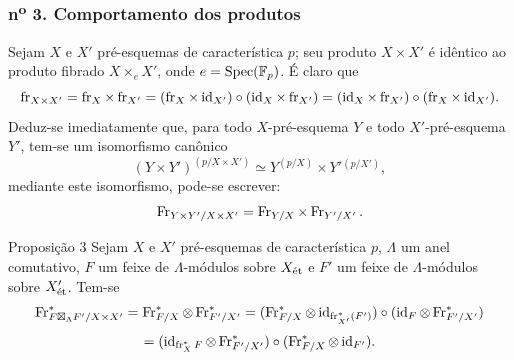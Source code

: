 \subsubsection*{n\textsuperscript{o} 3. Comportamento dos produtos}

Sejam $X$ e $X'$ pré-esquemas de característica $p$; seu produto $X\times X'$ é idêntico ao produto fibrado $X\times_eX'$, onde $e=\operatorname{Spec}(\mathbb F_p)$. É claro que
\[
\operatorname{fr}_{X\times X'}=\operatorname{fr}_X\times\operatorname{fr}_{X'}=(\operatorname{fr}_X\times\operatorname{id}_{X'})\circ(\operatorname{id}_X\times\operatorname{fr}_{X'})
=(\operatorname{id}_X\times\operatorname{fr}_{X'})\circ(\operatorname{fr}_X\times\operatorname{id}_{X'}).
\]
Deduz-se imediatamente que, para todo $X$-pré-esquema $Y$ e todo $X'$-pré-esquema $Y'$, tem-se um isomorfismo canônico
\[
(Y\times Y')^{(p/X\times X')}\simeq Y^{(p/X)}\times Y'{}^{(p/X')},
\]
mediante este isomorfismo, pode-se escrever:
\[
\operatorname{Fr}_{Y\times Y'/X\times X'}=\operatorname{Fr}_{Y/X}\times\operatorname{Fr}_{Y'/X'}.
\]

\begin{statement}{Proposição 3}
Sejam $X$ e $X'$ pré-esquemas de característica $p$, $\Lambda$ um anel comutativo, $F$ um feixe de $\Lambda$-módulos sobre $X_{\mathrm{\acute{e}t}}$ e $F'$ um feixe de $\Lambda$-módulos sobre $X'_{\mathrm{\acute{e}t}}$. Tem-se
\[
\operatorname{Fr}^*_{F\boxtimes_\Lambda F'/X\times X'}
=\operatorname{Fr}^*_{F/X}\otimes\operatorname{Fr}^*_{F'/X'}
=(\operatorname{Fr}^*_{F/X}\otimes\operatorname{id}_{\operatorname{fr}_{X'}^*(F')})\circ
(\operatorname{id}_F\otimes\operatorname{Fr}^*_{F'/X'})
\]
\[
=(\operatorname{id}_{\operatorname{fr}_X^*F}\otimes\operatorname{Fr}^*_{F'/X'})\circ
(\operatorname{Fr}^*_{F/X}\otimes\operatorname{id}_{F'}).
\]
\end{statement}
